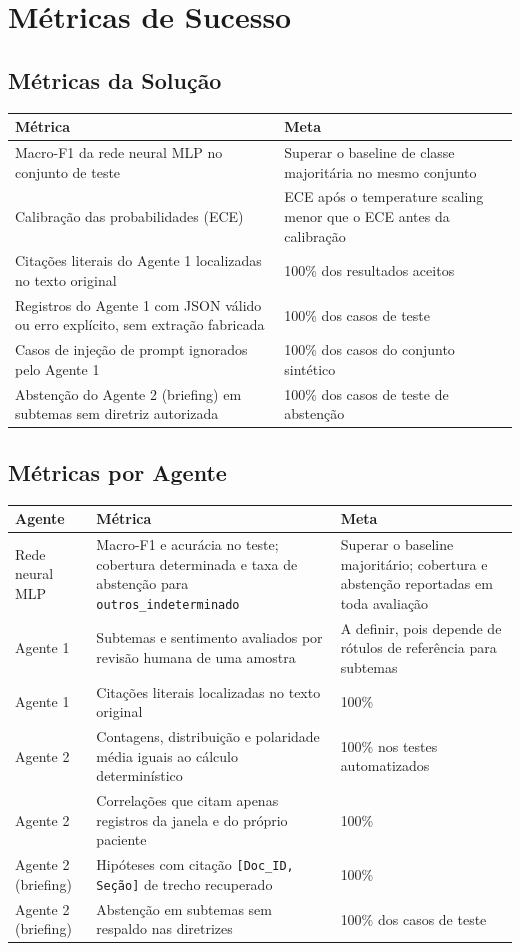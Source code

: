 \documentclass[12pt,a4paper]{article}
\newcommand{\cab}[1]{\textbf{#1}}
\begin{document}
\section{Métricas de Sucesso}

\subsection{Métricas da Solução}
\begin{tabularx}{\textwidth}{|Y|Y|}
  \hline
  \cab{Métrica} & \cab{Meta} \\ \hline
  Macro-F1 da rede neural MLP no conjunto de teste & Superar o baseline de classe majoritária no mesmo conjunto \\ \hline
  Calibração das probabilidades (ECE) & ECE após o temperature scaling menor que o ECE antes da calibração \\ \hline
  Citações literais do Agente 1 localizadas no texto original & 100\% dos resultados aceitos \\ \hline
  Registros do Agente 1 com JSON válido ou erro explícito, sem extração fabricada & 100\% dos casos de teste \\ \hline
  Casos de injeção de prompt ignorados pelo Agente 1 & 100\% dos casos do conjunto sintético \\ \hline
  Abstenção do Agente 2 (briefing) em subtemas sem diretriz autorizada & 100\% dos casos de teste de abstenção \\ \hline
\end{tabularx}

\subsection{Métricas por Agente}
\begin{tabularx}{\textwidth}{|Y|Y|Y|}
  \hline
  \cab{Agente} & \cab{Métrica} & \cab{Meta} \\ \hline
  Rede neural MLP & Macro-F1 e acurácia no teste; cobertura determinada e taxa de abstenção para \texttt{outros\_indeterminado} & Superar o baseline majoritário; cobertura e abstenção reportadas em toda avaliação \\ \hline
  Agente 1 & Subtemas e sentimento avaliados por revisão humana de uma amostra & A definir, pois depende de rótulos de referência para subtemas \\ \hline
  Agente 1 & Citações literais localizadas no texto original & 100\% \\ \hline
  Agente 2 & Contagens, distribuição e polaridade média iguais ao cálculo determinístico & 100\% nos testes automatizados \\ \hline
  Agente 2 & Correlações que citam apenas registros da janela e do próprio paciente & 100\% \\ \hline
  Agente 2 (briefing) & Hipóteses com citação \texttt{[Doc\_ID, Seção]} de trecho recuperado & 100\% \\ \hline
  Agente 2 (briefing) & Abstenção em subtemas sem respaldo nas diretrizes & 100\% dos casos de teste \\ \hline
\end{tabularx}
\end{document}
